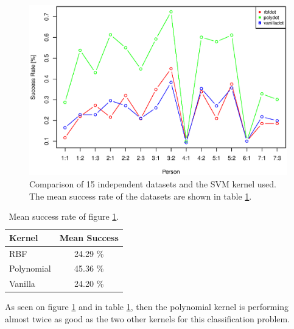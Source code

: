 \begin{figure}[H]
\centering
\includegraphics[width = \textwidth]{graphics/svm_kernel_comp}
\caption{Comparison of 15 independent datasets and the SVM kernel used. The mean success rate of the datasets are shown in table \ref{tab:mean_succes_kernel}.}
\label{fig:comp_kernel}
\end{figure}


\begin{table}[H]
\centering
\begin{tabular}{|l|c|}
\hline
Kernel & Mean Success\\ \hline
RBF & 24.29 \% \\ \hline
Polynomial & 45.36 \% \\ \hline
Vanilla & 24.20 \% \\ \hline
\end{tabular}
\caption{Mean success rate of figure \ref{fig:comp_kernel}.}
\label{tab:mean_succes_kernel}
\end{table}


As seen on figure \ref{fig:comp_kernel} and in table \ref{tab:mean_succes_kernel}, then the polynomial kernel is performing almost twice as good as the two other kernels for this classification problem.

